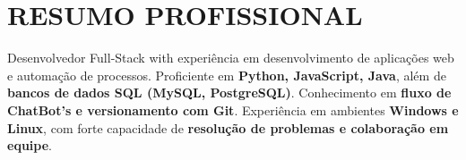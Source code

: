 \section{RESUMO PROFISSIONAL}
Desenvolvedor Full-Stack with experiência em desenvolvimento de aplicações web e automação de processos. Proficiente em \textbf{Python, JavaScript, Java}, além de \textbf{bancos de dados SQL (MySQL, PostgreSQL)}. Conhecimento em \textbf{fluxo de ChatBot’s e versionamento com Git}. Experiência em ambientes \textbf{Windows e Linux}, com forte capacidade de \textbf{resolução de problemas e colaboração em equipe}.
